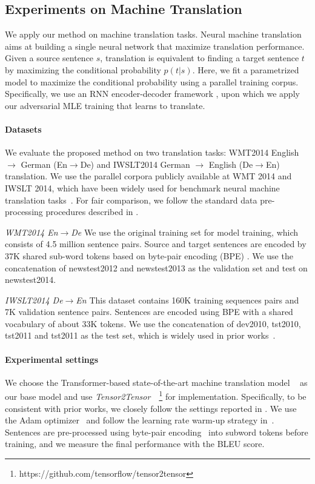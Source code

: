 \documentclass{article}
\begin{document}
\subsection{Experiments on Machine Translation}
We apply our method on machine translation tasks. Neural machine translation aims at building a single neural network
that maximize translation performance. 
Given a source sentence $s$, translation is equivalent to finding a target 
sentence $t$ by maximizing the conditional probability $p(t|s)$.
Here, we fit a parametrized model to maximize the conditional probability
using a parallel training corpus. Specifically, we use an RNN encoder-decoder framework \citep{cho2014learning, gehring2017convolutional, vaswani2017attention}, upon which we apply 
our adversarial MLE training that learns to translate. 




\paragraph{Datasets} 
We evaluate the proposed method on two translation tasks:
WMT2014 English $\to$ German (En$\to$De) and IWSLT2014 German $\to$ English (De$\to$En) translation. 
We use the parallel corpora publicly available at WMT 2014  and IWSLT 2014, 
which have been widely used for benchmark neural machine translation tasks~\cite{vaswani2017attention,gehring2017convolutional}. 
For fair comparison, we follow the standard data pre-processing procedures described in \citet{ranzato2015sequence, bahdanau2016actor}.


\noindent\emph{WMT2014 En$\to$De}
We use the original training set for model training, which consists of 
4.5 million sentence pairs. Source and target sentences are encoded by 
37K shared sub-word tokens based on byte-pair encoding (BPE) \citep{sennrich2015neural}.
We use the concatenation of newstest2012 and newstest2013 
as the validation set and test on newstest2014. 

\noindent\emph{IWSLT2014 De$\to$En}
This dataset contains 160K training sequences pairs and 7K validation sentence
pairs. Sentences are encoded using BPE with a shared vocabulary of about 33K tokens.
We use the concatenation of dev2010, tst2010, tst2011 and tst2011 as the test set, which is widely used in prior works~\citep{bahdanau2016actor}.

\paragraph{Experimental settings}
We choose the Transformer-based state-of-the-art machine translation model 
~\citep{vaswani2017attention} 
as our base model and use \textit{Tensor2Tensor}~\citep{tensor2tensor}~\footnote{https://github.com/tensorflow/tensor2tensor}
for implementation.
Specifically, 
to be consistent with prior works,
we closely follow the settings reported in \citet{vaswani2017attention}.
We use the Adam optimizer~\cite{kingma2014adam}
and follow the learning rate warm-up strategy in~\citet{vaswani2017attention}.
Sentences are pre-processed using byte-pair encoding~\citep{BPE} into subword tokens before training, 
and we measure the final performance with the BLEU score.
\end{document}
